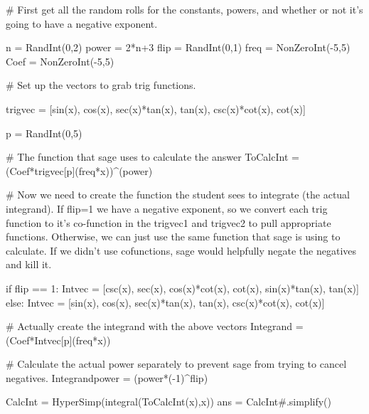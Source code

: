 \begin{sagesilent}
# First get all the random rolls for the constants, powers, and whether or not it's going to have a negative exponent.

n = RandInt(0,2)
power = 2*n+3
flip = RandInt(0,1)
freq = NonZeroInt(-5,5)
Coef = NonZeroInt(-5,5)

# Set up the vectors to grab trig functions.

trigvec = [sin(x), cos(x), sec(x)*tan(x), tan(x), csc(x)*cot(x), cot(x)]

p = RandInt(0,5)

# The function that sage uses to calculate the answer
ToCalcInt = (Coef*trigvec[p](freq*x))^(power)

# Now we need to create the function the student sees to integrate (the actual integrand). If flip=1 we have a negative exponent, so we convert each trig function to it's co-function in the trigvec1 and trigvec2 to pull appropriate functions. Otherwise, we can just use the same function that sage is using to calculate. If we didn't use cofunctions, sage would helpfully negate the negatives and kill it.

if flip == 1:
    Intvec = [csc(x), sec(x), cos(x)*cot(x), cot(x), sin(x)*tan(x), tan(x)]
else:
    Intvec = [sin(x), cos(x), sec(x)*tan(x), tan(x), csc(x)*cot(x), cot(x)]

# Actually create the integrand with the above vectors
Integrand = (Coef*Intvec[p](freq*x))

# Calculate the actual power separately to prevent sage from trying to cancel negatives.
Integrandpower = (power*(-1)^flip)



CalcInt = HyperSimp(integral(ToCalcInt(x),x))
ans = CalcInt#.simplify()

\end{sagesilent}




